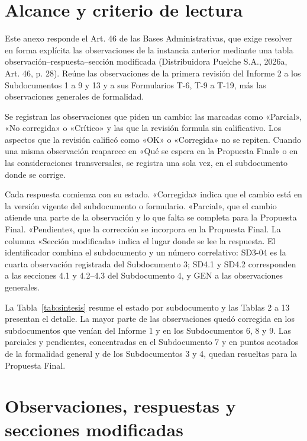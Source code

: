 \documentclass[carta,firma]{lafrox}
\begin{document}
\portadalafrox
\indicelafrox

\section{Alcance y criterio de lectura}

Este anexo responde el Art. 46 de las Bases Administrativas, que exige resolver en forma explícita las observaciones de la instancia anterior mediante una tabla observación–respuesta–sección modificada (Distribuidora Puelche S.A., 2026a, Art. 46, p. 28). Reúne las observaciones de la primera revisión del Informe 2 a los Subdocumentos 1 a 9 y 13 y a sus Formularios T-6, T-9 a T-19, más las observaciones generales de formalidad.

Se registran las observaciones que piden un cambio: las marcadas como «Parcial», «No corregida» o «Crítico» y las que la revisión formula sin calificativo. Los aspectos que la revisión calificó como «OK» o «Corregida» no se repiten. Cuando una misma observación reaparece en «Qué se espera en la Propuesta Final» o en las consideraciones transversales, se registra una sola vez, en el subdocumento donde se corrige.

Cada respuesta comienza con su estado. «Corregida» indica que el cambio está en la versión vigente del subdocumento o formulario. «Parcial», que el cambio atiende una parte de la observación y lo que falta se completa para la Propuesta Final. «Pendiente», que la corrección se incorpora en la Propuesta Final. La columna «Sección modificada» indica el lugar donde se lee la respuesta. El identificador combina el subdocumento y un número correlativo: SD3-04 es la cuarta observación registrada del Subdocumento 3; SD4.1 y SD4.2 corresponden a las secciones 4.1 y 4.2–4.3 del Subdocumento 4, y GEN a las observaciones generales.

La Tabla~\ref{tab:sintesis} resume el estado por subdocumento y las Tablas 2 a 13 presentan el detalle. La mayor parte de las observaciones quedó corregida en los subdocumentos que venían del Informe 1 y en los Subdocumentos 6, 8 y 9. Las parciales y pendientes, concentradas en el Subdocumento 7 y en puntos acotados de la formalidad general y de los Subdocumentos 3 y 4, quedan resueltas para la Propuesta Final.



\clearpage
{}
\section{Observaciones, respuestas y secciones modificadas}

\end{document}
